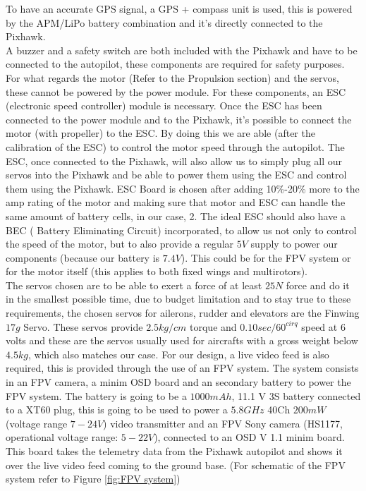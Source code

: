\documentclass[12pt]{article}
\begin{document}
\noindent To have an accurate GPS signal, a GPS + compass unit is used, this is powered by the APM/LiPo battery combination and it's directly connected to the Pixhawk. \cite{SENSOR5} \\

\noindent A buzzer and a safety switch are both included with the Pixhawk and have to be connected to the autopilot, these components are required for safety purposes. \cite{SENSOR5} For what regards the motor (Refer to the Propulsion section) and the servos, these cannot be powered by the power module. For these components, an ESC (electronic speed controller) module is necessary. Once the ESC has been connected to the power module and to the Pixhawk, it's possible to connect the motor (with propeller) to the ESC. By doing this we are able (after the calibration of the ESC) to control the motor speed through the autopilot. The ESC, once connected to the Pixhawk, will also allow us to simply plug all our servos into the Pixhawk and be able to power them using the ESC and control them using the Pixhawk. \cite{SENSOR6} \cite{SENSOR7} ESC Board is chosen after adding 10\%-20\% more to the amp rating of the motor and making sure that motor and ESC can handle the same amount of battery cells, in our case, 2. The ideal ESC should also have a BEC ( Battery Eliminating Circuit) incorporated, to allow us not only to control the speed of the motor, but to also provide a regular $5V$  supply to power our components (because our battery is $7.4V$). This could be for the FPV system or for the motor itself (this applies to both fixed wings and multirotors). \cite{SENSOR11}\\

\noindent The servos chosen are to be able to exert a force of at least $25N$ force and do it in the smallest possible time, due to budget limitation and to stay true to these requirements, the chosen servos for ailerons, rudder and elevators are the Finwing $17g$ Servo. These servos provide $2.5kg/cm$ torque and $0.10sec/60^{cirq}$ speed at 6 volts and  these are the servos usually used for aircrafts with a gross weight below $4.5kg$, which also matches our case. \cite{SENSOR8} \cite{SENSOR9} For our design, a live video feed is also required, this is provided through the use of an FPV system. The system consists in an FPV camera, a minim OSD board and an secondary battery to power the FPV system. The battery is going to be a $1000mAh$, 11.1 V 3S battery connected to a XT60 plug, this is going to be used to power a $5.8GHz$ 40Ch $200mW$ (voltage range $7 - 24V$) video transmitter and an FPV Sony camera (HS1177, operational voltage range: $5 - 22V$), connected to an OSD V 1.1 minim board. This board takes the telemetry data from the Pixhawk autopilot and shows it over the live video feed coming to the ground base. (For schematic of the FPV system refer to Figure \ref{fig:FPV system}) \cite{SENSOR10} \\
\end{document}
